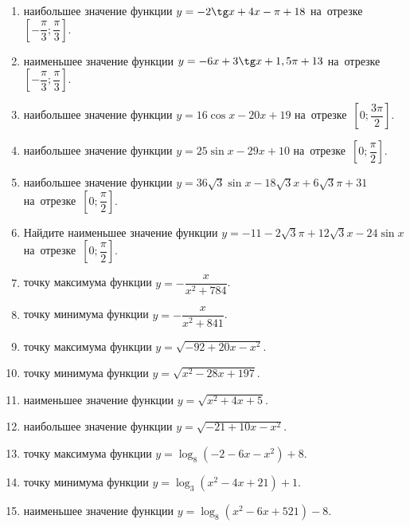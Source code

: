 \documentclass[a4paper,10pt]{article}
\begin{document}
\begin{enumerate}
\item {} наибольшее значение функции $y=-2\tg x +4x-\pi +18$ на~отрезке~$\left[-\dfrac{\pi}{3};\dfrac{\pi}{3}\right]$.

\item {} наименьшее значение функции $y=-6x +3\tg x+1,5\pi+13$ на~отрезке~$\left[-\dfrac{\pi}{3};\dfrac{\pi}{3}\right]$.

\item {} наибольшее значение функции $y=16\cos x-20x+19$ на~отрезке~$\left[0;\dfrac{3\pi}{2}\right]$.

\item {} наибольшее значение функции $y=25\sin x-29x+10$ на~отрезке~$\left[0;\dfrac{\pi}{2}\right]$.

\item {} наибольшее значение функции $y=36\sqrt{3}\sin x-18\sqrt{3}x+6\sqrt{3}\pi +31$ на~отрезке~$\left[0;\dfrac{\pi}{2}\right]$.

\item Найдите наименьшее значение функции $y=-11-2\sqrt{3}\pi+12\sqrt{3}x-24\sin x$ на~отрезке~$\left[0;\dfrac{\pi}{2}\right]$.

\item {} точку максимума функции $y=-\dfrac{x}{ x^2 +784}$.

\item {} точку минимума функции $y=-\dfrac{x}{ x^2 +841}$.

\item {} точку максимума функции $y=\sqrt{-92+20x-x^2}$.

\item {} точку минимума функции $y=\sqrt{x^2-28x+197}$.

\item {} наименьшее значение функции $y=\sqrt{x^2+4x+5}$.

\item {} наибольшее значение функции $y=\sqrt{-21+10x-x^2}$.

\item {} точку максимума функции $y=\log_8\left(-2-6x-x^2\right)+8$.

\item {} точку минимума функции $y=\log_3\left(x^2-4x+21\right)+1$.

\item {} наименьшее значение функции $y=\log_8\left(x^2-6x+521\right)-8$.


\end{enumerate}
\end{document}
